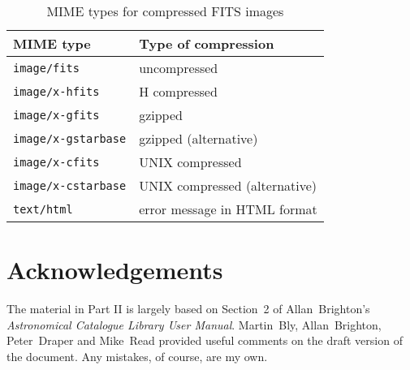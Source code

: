\documentclass[twoside,11pt,nolof,chapters]{starlink}
\begin{document}
\begin{table}[htbp]

\begin{center}
\begin{tabular}{ll}
MIME type                & Type of compression   \\ \hline
\texttt{image/fits}         & uncompressed          \\
\texttt{image/x-hfits}      & H compressed          \\
\texttt{image/x-gfits}      & gzipped               \\
\texttt{image/x-gstarbase}  & gzipped (alternative) \\
\texttt{image/x-cfits}      & UNIX compressed       \\
\texttt{image/x-cstarbase}  & UNIX compressed (alternative)  \\
\texttt{text/html}          & error message in HTML format   \\
\end{tabular}

\caption{MIME types for compressed FITS images \label{FITS_MIME} }
\end{center}

\end{table}

{}
\section*{Acknowledgements}

The material in Part II is largely based on Section~2 of Allan~Brighton's
\textit{Astronomical Catalogue Library User Manual}\/\cite{BRIGHTON98}.
Martin~Bly, Allan~Brighton, Peter~Draper and Mike~Read provided useful
comments on the draft version of the document.  Any mistakes, of course,
are my own.




% 
\end{document}
